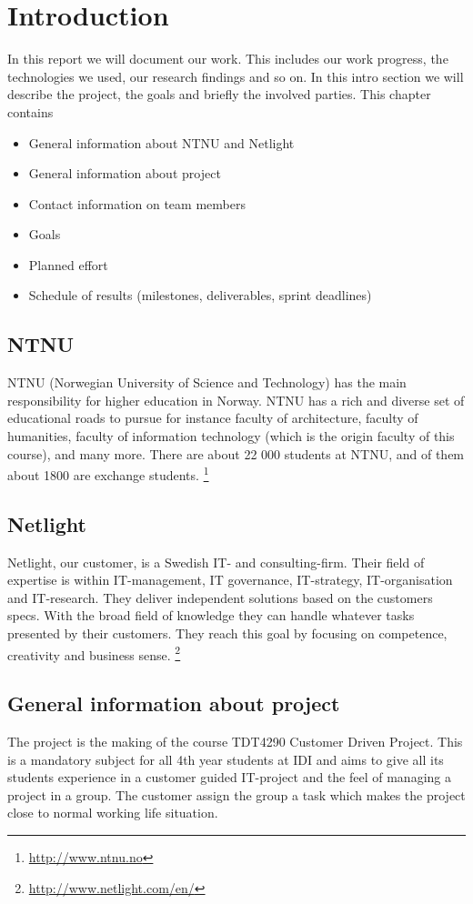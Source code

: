 \chapter{Introduction}
In this report we will document our work. This includes our work progress, the technologies we used, our research findings and so on. In this intro section we will describe the project, the goals and briefly the involved parties.
    This chapter contains
\begin{itemize}
\item General information about NTNU and Netlight
\item General information about project
\item Contact information on team members
\item Goals
\item Planned effort
\item Schedule of results (milestones, deliverables, sprint deadlines)
\end{itemize}

\section{NTNU}
NTNU (Norwegian University of Science and Technology) has the main responsibility for higher education in Norway. NTNU has a rich and diverse set of educational roads to pursue for instance faculty of architecture, faculty of humanities, faculty of information technology (which is the origin faculty of this course), and many more. There are about 22 000 students at NTNU, and of them about 1800 are exchange students. 
\footnote{\url{http://www.ntnu.no}}

\section{Netlight}
Netlight, our customer, is a Swedish IT- and consulting-firm. Their field of expertise is within IT-management, IT governance, IT-strategy, IT-organisation and IT-research. They deliver independent solutions based on the customers specs. With the broad field of knowledge they can handle whatever tasks presented by their customers. They reach this goal by focusing on competence, creativity and business sense.
\footnote{\url{http://www.netlight.com/en/}}

\section{General information about project}
The project is the making of the course TDT4290 Customer Driven Project. This is a mandatory subject for all 4th year students at IDI and aims to give all its students experience in a customer guided IT-project and the feel of managing a project in a group. The customer assign the group a task which makes the project close to normal working life situation.


